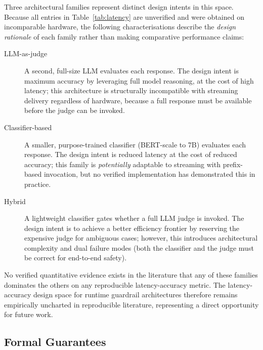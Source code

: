 Three architectural families represent distinct design intents in this space.
Because all entries in Table~\ref{tab:latency} are unverified and were obtained
on incomparable hardware, the following characterisations describe the
\emph{design rationale} of each family rather than making comparative performance
claims:

\begin{description}
  \item[LLM-as-judge] A second, full-size LLM evaluates each response.
        The design intent is maximum accuracy by leveraging full model reasoning,
        at the cost of high latency; this architecture is structurally incompatible
        with streaming delivery regardless of hardware, because a full response must
        be available before the judge can be invoked.
  \item[Classifier-based] A smaller, purpose-trained classifier (BERT-scale to 7B)
        evaluates each response.
        The design intent is reduced latency at the cost of reduced accuracy;
        this family is \emph{potentially} adaptable to streaming with prefix-based
        invocation, but no verified implementation has demonstrated this in practice.
  \item[Hybrid] A lightweight classifier gates whether a full LLM judge is invoked.
        The design intent is to achieve a better efficiency frontier by reserving
        the expensive judge for ambiguous cases; however, this introduces
        architectural complexity and dual failure modes (both the classifier and the
        judge must be correct for end-to-end safety).
\end{description}

No verified quantitative evidence exists in the literature that any of these
families dominates the others on any reproducible latency-accuracy metric.
The latency-accuracy design space for runtime guardrail architectures therefore
remains empirically uncharted in reproducible literature, representing a direct
opportunity for future work.

\subsection{Formal Guarantees}

